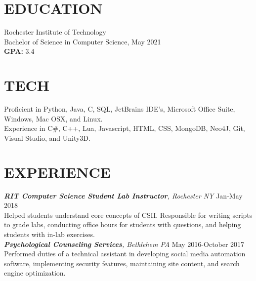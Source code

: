 \documentclass[line, margin]{res}
\begin{document}
\address{(484) 554-8487\\ emp9173@rit.edu}





 
 
 
\begin{resume}
\section{EDUCATION} 
 Rochester Institute of Technology \\
 Bachelor of Science in Computer Science, May 2021\\
 \textbf{GPA:} 3.4
 
\section{TECH}
Proficient in Python, Java, C, SQL, JetBrains IDE’s, Microsoft Office Suite, Windows, Mac OSX, and Linux. \\
Experience in C\#, C++, Lua, Javascript, HTML, CSS, MongoDB, Neo4J, Git, Visual Studio, and Unity3D.
 
\section{EXPERIENCE} 
\textit{\textbf{RIT Computer Science Student Lab Instructor}, Rochester NY} \hfill Jan-May 2018 \\
Helped students understand core concepts of CSII. Responsible for writing scripts
to grade labs, conducting office hours for students with questions, and helping students
with in-lab exercises.\\ [10pt]
\textit{\textbf{Psychological Counseling Services}, Bethlehem PA} \hfill May 2016-October 2017 \\
Performed duties of a technical assistant in developing social media automation
software, implementing security features, maintaining site content, and
search engine optimization.
 

\end{resume}
\end{document}
